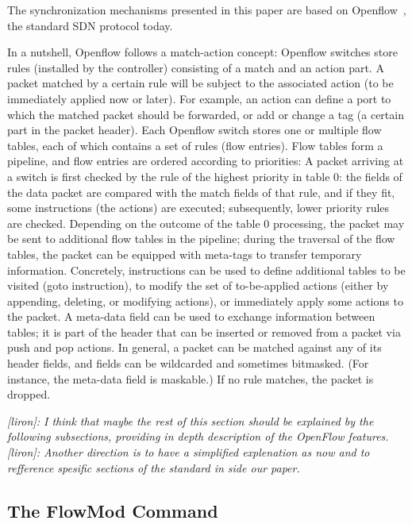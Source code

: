 \documentclass[conference]{sigcomm-alternate}
\newcommand{\liron}[1]{\textit{\textcolor{mygreen}{[liron]: #1}}} %
\begin{document}
The synchronization mechanisms presented in this paper
are based on Openflow~\cite{of-spec}, the standard SDN protocol today.

In a nutshell,
Openflow
follows a match-action concept: Openflow switches store
rules (installed by the controller) consisting of a match and an
action part. A packet matched by a certain rule will be subject
to the associated action (to be immediately applied now or later).
For example, an action can define a port to which the
matched packet should be forwarded, or add or change a tag
(a certain part in the packet header).
Each Openflow switch stores one or multiple flow tables,
each of which contains a set of rules (flow entries). Flow
tables form a pipeline, and flow entries are ordered according
to priorities: A packet arriving at a switch is first checked by
the rule of the highest priority in table 0: the fields of the
data packet are compared with the match fields of that rule,
and if they fit, some instructions (the actions) are executed;
subsequently, lower priority rules are checked. Depending on
the outcome of the table 0 processing, the packet may be sent
to additional flow tables in the pipeline; during the traversal of
the flow tables, the packet can be equipped with meta-tags to
transfer temporary information. Concretely, instructions can be
used to define additional tables to be visited (goto instruction),
to modify the set of to-be-applied actions (either by appending,
deleting, or modifying actions), or immediately apply some
actions to the packet. A meta-data field can be used to exchange
information between tables; it is part of the header that can be
inserted or removed from a packet via push and pop actions.
In general, a packet can be matched against any of its header
fields, and fields can be wildcarded and sometimes bitmasked.
(For instance, the meta-data field is maskable.) If no rule
matches, the packet is dropped.

\liron{I think that maybe the rest of this section should be explained by the following subsections, providing in depth description of the OpenFlow features.}
\liron{Another direction is to have a simplified explenation as now and to refference spesific sections of the standard in side our paper.}

\subsection{The FlowMod Command}
\end{document}
